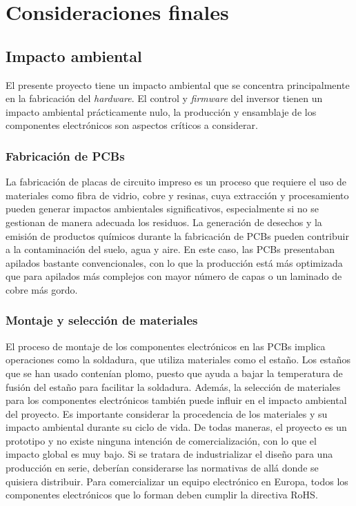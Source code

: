 \chapter{Consideraciones finales}

\section*{Impacto ambiental}

El presente proyecto tiene un impacto ambiental que se concentra principalmente en la fabricación del \textit{hardware}. El control y \textit{firmware} del inversor tienen un impacto ambiental prácticamente nulo, la producción y ensamblaje de los componentes electrónicos son aspectos críticos a considerar.

\subsection*{Fabricación de PCBs}

La fabricación de placas de circuito impreso es un proceso que requiere el uso de materiales como fibra de vidrio, cobre y resinas, cuya extracción y procesamiento pueden generar impactos ambientales significativos, especialmente si no se gestionan de manera adecuada los residuos. La generación de desechos y la emisión de productos químicos durante la fabricación de PCBs pueden contribuir a la contaminación del suelo, agua y aire. En este caso, las PCBs presentaban apilados bastante convencionales, con lo que la producción está más optimizada que para apilados más complejos con mayor número de capas o un laminado de cobre más gordo.

\subsection*{Montaje y selección de materiales}

El proceso de montaje de los componentes electrónicos en las PCBs implica operaciones como la soldadura, que utiliza materiales como el estaño. Los estaños que se han usado contenían plomo, puesto que ayuda a bajar la temperatura de fusión del estaño para facilitar la soldadura. Además, la selección de materiales para los componentes electrónicos también puede influir en el impacto ambiental del proyecto. Es importante considerar la procedencia de los materiales y su impacto ambiental durante su ciclo de vida. De todas maneras, el proyecto es un prototipo y no existe ninguna intención de comercialización, con lo que el impacto global es muy bajo. Si se tratara de industrializar el diseño para una producción en serie, deberían considerarse las normativas de allá donde se quisiera distribuir. Para comercializar un equipo electrónico en Europa, todos los componentes electrónicos que lo forman deben cumplir la directiva RoHS.


